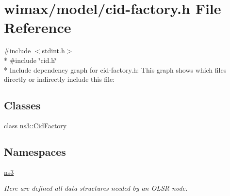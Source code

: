 \hypertarget{cid-factory_8h}{}\section{wimax/model/cid-\/factory.h File Reference}
\label{cid-factory_8h}
{\ttfamily \#include $<$stdint.\+h$>$}\\*
{\ttfamily \#include \char`\"{}cid.\+h\char`\"{}}\\*
Include dependency graph for cid-\/factory.h\+:
This graph shows which files directly or indirectly include this file\+:
\subsection*{Classes}
\begin{DoxyCompactItemize}
\item 
class \hyperlink{classns3_1_1CidFactory}{ns3\+::\+Cid\+Factory}
\end{DoxyCompactItemize}
\subsection*{Namespaces}
\begin{DoxyCompactItemize}
\item 
 \hyperlink{namespacens3}{ns3}
\begin{DoxyCompactList}\small\item\em Here are defined all data structures needed by an O\+L\+SR node. \end{DoxyCompactList}\end{DoxyCompactItemize}
